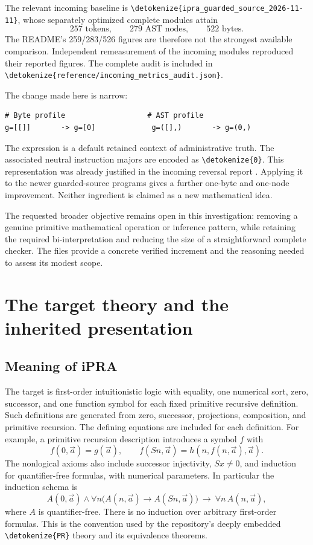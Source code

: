 \documentclass[11pt,letterpaper]{article}
\theoremstyle{definition}
\theoremstyle{remark}
\newcommand{\file}[1]{\expandafter\nolinkurl\expandafter{\detokenize{#1}}}
\begin{document}
The relevant incoming baseline is \file{ipra_guarded_source_2026-11-11},
whose separately optimized complete modules attain
\[
  257\text{ tokens},\qquad279\text{ AST nodes},\qquad522\text{ bytes}.
\]
The README's 259/283/526 figures are therefore not the strongest available
comparison. Independent remeasurement of the incoming modules reproduced
their reported figures. The complete audit is included in
\file{reference/incoming_metrics_audit.json}.

The change made here is narrow:
\begin{lstlisting}
# Byte profile                   # AST profile
g=[[]]       -> g=[0]             g=([],)       -> g=(0,)
\end{lstlisting}
The expression is a default retained context of administrative truth.
The associated neutral instruction majors are encoded as \file{0}.
This representation was already justified in the incoming reversal
report \cite{reversal}. Applying it to the newer guarded-source programs
gives a further one-byte and one-node improvement. Neither ingredient is
claimed as a new mathematical idea.

The requested broader objective remains open in this investigation:
removing a genuine primitive mathematical operation or inference pattern,
while retaining the required bi-interpretation and reducing the size of a
straightforward complete checker. The files provide a concrete verified
increment and the reasoning needed to assess its modest scope.

\section{The target theory and the inherited presentation}
\label{sec:theory}

\subsection{Meaning of iPRA}

The target is first-order intuitionistic logic with equality, one numerical
sort, zero, successor, and one function symbol for each fixed primitive
recursive definition. Such definitions are generated from zero, successor,
projections, composition, and primitive recursion. The defining equations
are included for each definition. For example, a primitive recursion
description introduces a symbol $f$ with
\[
 f(0,\vec a)=g(\vec a),\qquad
 f(Sn,\vec a)=h(n,f(n,\vec a),\vec a).
\]
The nonlogical axioms also include successor injectivity,
$Sx\ne0$, and induction for quantifier-free formulas, with numerical
parameters. In particular the induction schema is
\[
 A(0,\vec a)\wedge
 \forall n\bigl(A(n,\vec a)\to A(Sn,\vec a)\bigr)
 \ \to\ \forall n\,A(n,\vec a),
\]
where $A$ is quantifier-free. There is no induction over arbitrary
first-order formulas. This is the convention used by the repository's
deeply embedded \file{PR} theory and its equivalence theorems.
\end{document}
